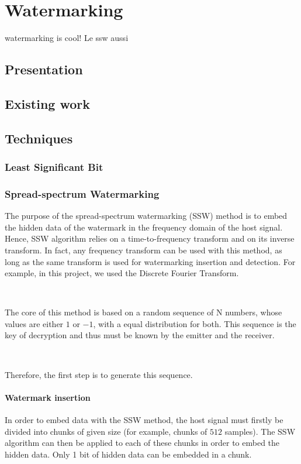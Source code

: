 \chapter{Watermarking}
\Gls{watermarking} is cool! Le ssw aussi\cite{cox1997secure}
\section{Presentation}
\section{Existing work}
\section{Techniques}
\subsection{Least Significant Bit}
\subsection{Spread-spectrum Watermarking}

The purpose of the spread-spectrum watermarking (SSW) method is to embed the hidden data of the watermark in the frequency domain of the host signal. Hence, SSW algorithm relies on a time-to-frequency transform and on its inverse transform. In fact, any frequency transform can be used with this method, as long as the same transform is used for watermarking insertion and detection. For example, in this project, we used the Discrete Fourier Transform.

~

The core of this method is based on a random sequence of N numbers, whose values are either $1$ or $-1$, with a equal distribution for both. This sequence is the key of decryption and thus must be known by the emitter and the receiver.

~

Therefore, the first step is to generate this sequence.

\subsubsection{Watermark insertion}

In order to embed data with the SSW method, the host signal must firstly be divided into chunks of given size (for example, chunks of $512$ samples). The SSW algorithm can then be applied to each of these chunks in order to embed the hidden data. Only 1 bit of hidden data can be embedded in a chunk.


